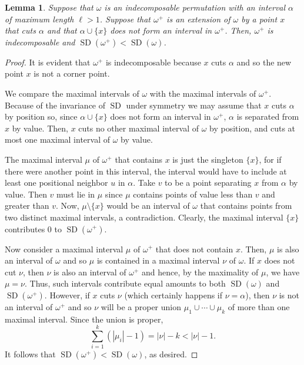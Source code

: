 \documentclass[10pt]{article}
\theoremstyle{plain}
\newtheorem{lemma}[theorem]{Lemma}
\newcommand{\SD}{\operatorname{SD}}
\begin{document}
\begin{lemma}
	\label{lemma:MI}
	Suppose that $\omega$ is an indecomposable permutation with an interval $\alpha$ of maximum length $\ell > 1$. Suppose that $\omega^+$ is an extension of $\omega$ by a point $x$ that cuts $\alpha$ and that $\alpha \cup \{x\}$ does not form an interval in $\omega^+$. Then, $\omega^+$ is indecomposable and $\SD(\omega^+) < \SD(\omega)$.
\end{lemma}
\begin{proof}
	It is evident that $\omega^+$ is indecomposable because $x$ cuts $\alpha$ and so the new point $x$ is not a corner point.
	
	We compare the maximal intervals of $\omega$ with the maximal intervals of $\omega^+$. Because of the invariance of $\SD$ under symmetry  we may assume that $x$ cuts $\alpha$ by position so, since  $\alpha \cup \{x\}$ does not form an interval in $\omega^+$, $\alpha$ is separated from $x$ by value. Then, $x$ cuts no other maximal interval of $\omega$ by position, and cuts at most one maximal interval of $\omega$ by value.
	
	The maximal interval $\mu$ of $\omega^+$ that contains $x$ is just the singleton $\{x\}$, for if there were another point in this interval, the interval would have to include at least one positional neighbor $u$ in $\alpha$. Take $v$ to be a point separating $x$ from $\alpha$ by value. Then $v$ must lie in $\mu$ since $\mu$ contains points of value less than $v$ and greater than $v$. Now, $\mu \setminus \{x\}$ would be an interval of $\omega$ that contains points from two distinct maximal intervals, a contradiction. Clearly, the maximal interval $\{x\}$ contributes $0$ to $\SD (\omega^+)$.
	
	Now consider a maximal interval $\mu$ of $\omega^+$ that does not contain $x$. Then, $\mu$ is also an interval of $\omega$ and so $\mu$ is contained in a maximal interval $\nu$ of $\omega$. If $x$ does not cut $\nu$, then $\nu$ is also an interval of $\omega^+$ and hence, by the maximality of $\mu$, we have $\mu = \nu$. Thus, such intervals contribute equal amounts to both $\SD(\omega)$ and $\SD(\omega^+)$. However, if $x$ cuts $\nu$ (which certainly happens if $\nu = \alpha$), then $\nu$ is not an interval of $\omega^+$ and so $\nu$ will be a proper union $\mu_1 \cup \cdots \cup \mu_k$ of more than one maximal interval. Since the union is proper,
		\[
			\sum_{i=1}^k \left(|\mu_i|-1\right) = |\nu|-k < |\nu|-1.
		\]
It follows that $\SD(\omega^+) < \SD(\omega)$, as desired.
\end{proof}
\end{document}
